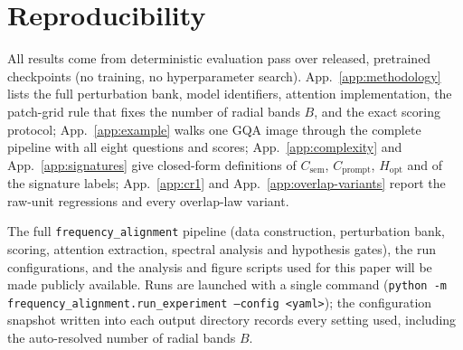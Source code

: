 \documentclass[10pt,twocolumn,letterpaper]{article}
\newcommand{\Csem}{C_{\mathrm{sem}}}
\newcommand{\Cprompt}{C_{\mathrm{prompt}}}
\newcommand{\Hopt}{H_{\mathrm{opt}}}
\begin{document}
\section{Reproducibility}
\label{app:repro}

All results come from deterministic evaluation pass over released, pretrained checkpoints (no training, no hyperparameter search). App.~\ref{app:methodology} lists the full perturbation bank, model identifiers, attention implementation, the patch-grid rule that fixes the number of radial bands $B$, and the exact scoring protocol; App.~\ref{app:example} walks one GQA image through the complete pipeline with all eight questions and scores; App.~\ref{app:complexity} and App.~\ref{app:signatures} give closed-form definitions of $\Csem$, $\Cprompt$, $\Hopt$ and of the signature labels; App.~\ref{app:cr1} and App.~\ref{app:overlap-variants} report the raw-unit regressions and every overlap-law variant.

The full \texttt{frequency\_alignment} pipeline (data construction, perturbation bank, scoring, attention extraction, spectral analysis and hypothesis gates), the run configurations, and the analysis and figure scripts used for this paper will be made publicly available. Runs are launched with a single command (\texttt{python -m frequency\_alignment.run\_experiment --config <yaml>}); the configuration snapshot written into each output directory records every setting used, including the auto-resolved number of radial bands $B$.

{
    \small
    
    
}
\end{document}
